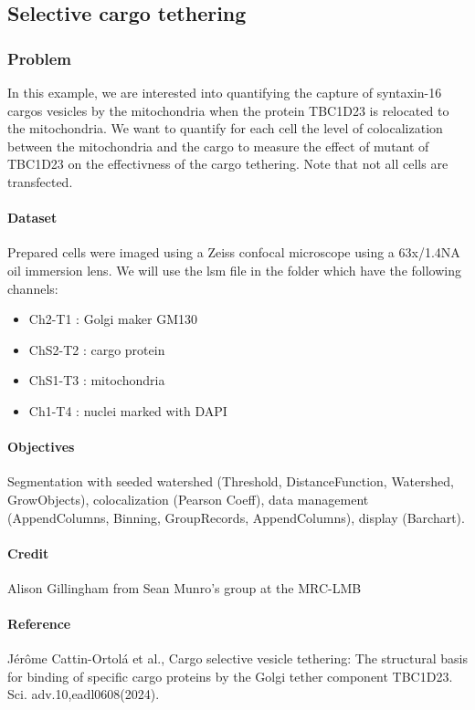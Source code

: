 \subsection{Selective cargo tethering}

\subsubsection*{Problem}

In this example, we are interested into quantifying the capture of syntaxin-16 cargos vesicles by the mitochondria when the protein TBC1D23 is relocated to the mitochondria. We want to quantify for each cell the level of colocalization between the mitochondria and the cargo to measure the effect of mutant of TBC1D23 on the effectivness of the cargo tethering. Note that not all cells are transfected.


\paragraph{Dataset} Prepared cells were imaged using a Zeiss confocal microscope using a 63x/1.4NA oil immersion lens. We will use the lsm file in the folder  which have the following channels:

\begin{itemize}\setlength\itemsep{0em}
    \item Ch2-T1 : Golgi maker GM130
    \item ChS2-T2 : cargo protein
    \item ChS1-T3 : mitochondria
    \item Ch1-T4 : nuclei marked with DAPI
\end{itemize}

\paragraph{Objectives} Segmentation with seeded watershed (Threshold, DistanceFunction, Watershed, GrowObjects), colocalization (Pearson Coeff), data management (AppendColumns, Binning, GroupRecords, AppendColumns), display (Barchart).

\paragraph{Credit}  Alison Gillingham from Sean Munro's group at the MRC-LMB

\paragraph{Reference} Jérôme Cattin-Ortolá et al., Cargo selective vesicle tethering: The structural basis for binding of specific cargo proteins by the Golgi tether component TBC1D23. Sci. adv.10,eadl0608(2024). 

